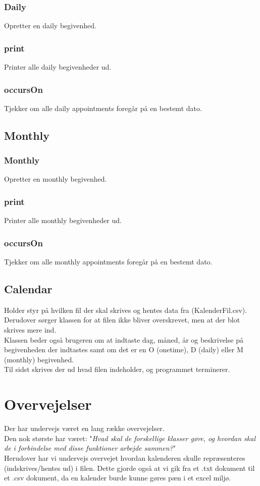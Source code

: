 \documentclass[a4paper,11pt]{article}
\begin{document}
\subsubsection*{Daily}
Opretter en daily begivenhed.

\subsubsection*{print}
Printer alle daily begivenheder ud.

\subsubsection*{occursOn}
Tjekker om alle daily appointments foregår på en bestemt dato.


\subsection*{Monthly}
\subsubsection*{Monthly}
Opretter en monthly begivenhed.

\subsubsection*{print}
Printer alle monthly begivenheder ud.

\subsubsection*{occursOn}
Tjekker om alle monthly appointments foregår på en bestemt dato.


\subsection*{Calendar}
Holder styr på hvilken fil der skal skrives og hentes data fra (KalenderFil.csv). Derudover sørger klassen for at filen ikke bliver overskrevet, men at der blot skrives mere ind. \\
Klassen beder også brugeren om at indtaste dag, måned, år og beskrivelse på begivenheden der indtastes samt om det er en O (onetime), D (daily) eller M (monthly) begivenhed. \\
Til sidst skrives der ud hvad filen indeholder, og programmet terminerer.

\section*{Overvejelser}
Der har undervejs været en lang række overvejelser. \\
Den nok største har været: "\textit{Hvad skal de forskellige klasser gøre, og hvordan skal de i forbindelse med disse funktioner arbejde sammen?}" \\
Herudover har vi undervejs overvejet hvordan kalenderen skulle repræsenteres (indskrives/hentes ud) i filen. Dette gjorde også at vi gik fra et .txt dokument til et .csv dokument, da en kalender burde kunne gøres pæn i et excel miljø.
\end{document}

